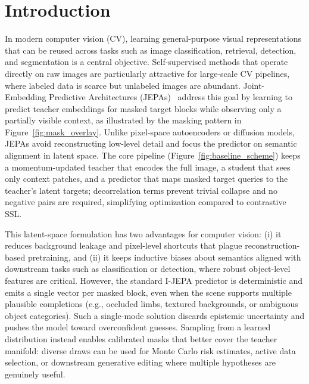 \documentclass[conference]{IEEEtran}
\begin{document}
\section{Introduction}
In modern computer vision (CV), learning general-purpose visual representations that can be reused across tasks such as image classification, retrieval, detection, and segmentation is a central objective.
Self-supervised methods that operate directly on raw images are particularly attractive for large-scale CV pipelines, where labeled data is scarce but unlabeled images are abundant.
Joint-Embedding Predictive Architectures (JEPAs)~\cite{assran2023jepa} address this goal by learning to predict teacher embeddings for masked target blocks while observing only a partially visible context, as illustrated by the masking pattern in Figure~\ref{fig:mask_overlay}.
Unlike pixel-space autoencoders or diffusion models, JEPAs avoid reconstructing low-level detail and focus the predictor on semantic alignment in latent space.
The core pipeline (Figure~\ref{fig:baseline_scheme}) keeps a momentum-updated teacher that encodes the full image, a student that sees only context patches, and a predictor that maps masked target queries to the teacher's latent targets; decorrelation terms prevent trivial collapse and no negative pairs are required, simplifying optimization compared to contrastive SSL.

This latent-space formulation has two advantages for computer vision: (i) it reduces background leakage and pixel-level shortcuts that plague reconstruction-based pretraining, and (ii) it keeps inductive biases about semantics aligned with downstream tasks such as classification or detection, where robust object-level features are critical.
However, the standard I-JEPA predictor is deterministic and emits a single vector per masked block, even when the scene supports multiple plausible completions (e.g., occluded limbs, textured backgrounds, or ambiguous object categories).
Such a single-mode solution discards epistemic uncertainty and pushes the model toward overconfident guesses.
Sampling from a learned distribution instead enables calibrated masks that better cover the teacher manifold: diverse draws can be used for Monte Carlo risk estimates, active data selection, or downstream generative editing where multiple hypotheses are genuinely useful.
\end{document}
